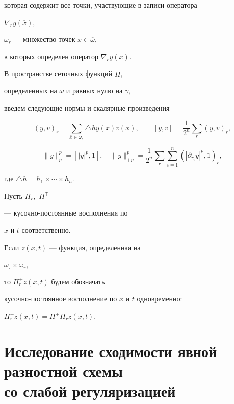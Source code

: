 которая содержит все точки, участвующие в записи оператора


$\nabla_{r} y(\overline{x}),$


$\omega_r$ --- множество точек $\overline{x} \in \overline{\omega},$


в которых определен оператор $\nabla_{r} y(\overline{x}).$


В пространстве сеточных функций  $\overset\circ H$,


определенных на $\overline{\omega}$ и равных нулю на $\gamma$,


введем следующие нормы и скалярные произведения


$$


 ( y ,v )_{r} = \sum^{}_{\overline{x} \in \omega_{r}}


 \triangle h y(\overline{x})


 v(\overline{x}) , \qquad


 [y,v] = \frac{1}{2^{n}}\sum_{r} (y,v)_{r},


$$


%


$$


\|y \|^{p}_{p}= [|y|^{p},1],\quad


\|y \|^{p}_{+p} = \frac{1}{2^n} \sum_{r} \sum^{n}_{i=1}


( |\partial_{r_{i}} y |^{p} , 1 )_{r},


$$


где $\triangle h = h_1 \times \dotsb \times h_n $.


Пусть ${\Pi}_r,$ $\Pi^\mp$


--- кусочно-постоянные восполнения по


$ x $ и $ t $ соответственно.


Если $ z(x,t) $ --- функция, определенная на


$ \overline{\omega}_{\tau} \times \omega_{r}, $


то $ {\Pi}^{\mp}_r z(x,t) $ будем обозначать


кусочно-постоянное восполнение по $x$ и $t$ одновременно:


$  {\Pi}^{\mp}_r z(x,t) = {\Pi}^{\mp} {\Pi}_{r} z(x,t). $





\section{Исследование сходимости явной разностной схемы\protect\\


со слабой регуляризацией}





